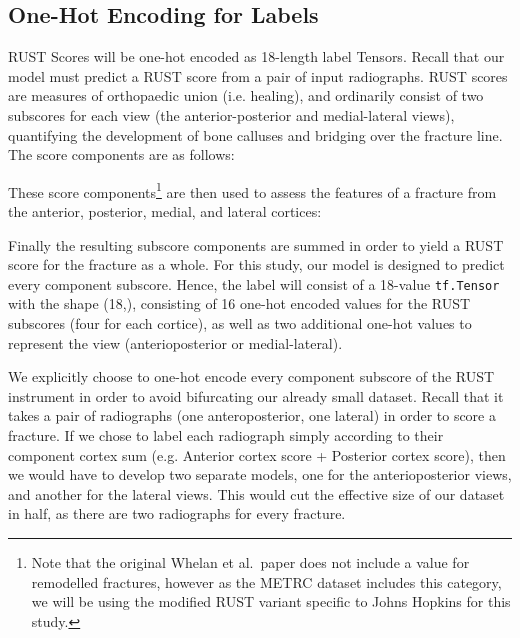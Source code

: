 \subsection{One-Hot Encoding for Labels}

RUST Scores will be one-hot encoded as 18-length label Tensors. Recall that our model must predict a RUST score from a pair of input radiographs. RUST scores are measures of orthopaedic union (i.e. healing), and ordinarily consist of two subscores for each view (the anterior-posterior and medial-lateral views), quantifying the development of bone calluses and bridging over the fracture line. The score components are as follows:



\noindent
These score components\footnote{Note that the original Whelan et al.\ paper \autocite{Whelan2010} does not include a value for remodelled fractures, however as the METRC dataset includes this category, we will be using the modified RUST variant specific to Johns Hopkins for this study.} are then used to assess the features of a fracture from the anterior, posterior, medial, and lateral cortices:



\noindent
Finally the resulting subscore components are summed in order to yield a RUST score for the fracture as a whole.
For this study, our model is designed to predict every component subscore. Hence, the label will consist of a 18-value \texttt{tf.Tensor} with the shape (18,), consisting of 16 one-hot encoded values for the RUST subscores (four for each cortice), as well as two additional one-hot values to represent the view (anterioposterior or medial-lateral).

We explicitly choose to one-hot encode every component subscore of the RUST instrument in order to avoid bifurcating our already small dataset. Recall that it takes a pair of radiographs (one anteroposterior, one lateral) in order to score a fracture. If we chose to label each radiograph simply according to their component cortex sum (e.g. Anterior cortex score + Posterior cortex score), then we would have to develop two separate models, one for the anterioposterior views, and another for the lateral views. This would cut the effective size of our dataset in half, as there are two radiographs for every fracture.


